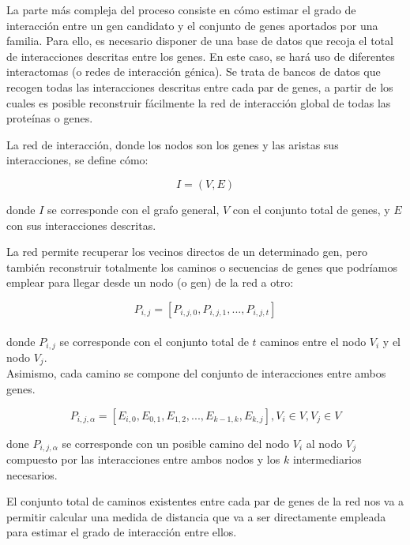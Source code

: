 La parte más compleja del proceso consiste en cómo estimar el grado de interacción entre un gen candidato y el conjunto de genes aportados por una familia. Para ello, es necesario disponer de una base de datos que recoja el total de interacciones descritas entre los genes. En este caso, se hará uso de diferentes interactomas (o redes de interacción génica). Se trata de bancos de datos que recogen todas las interacciones descritas entre cada par de genes, a partir de los cuales es posible reconstruir fácilmente la red de interacción global de todas las proteínas o genes. 

\medskip
La red de interacción, donde los nodos son los genes y las aristas sus interacciones, se define cómo:


\begin{equation}
I = (V,E)
\end{equation}

donde $I$ se corresponde con el grafo general, $V$ con el conjunto total de genes, y $E$ con sus interacciones descritas.

\medskip
La red permite recuperar los vecinos directos de un determinado gen, pero también reconstruir totalmente los caminos o secuencias de genes que podríamos emplear para llegar desde un nodo (o gen) de la red a otro:

\begin{equation}
 P_{i,j} = [P_{i,j,0},P_{i,j,1},...,P_{i,j,t}]
\end{equation}
\\

donde $P_{i,j}$ se corresponde con el conjunto total de $t$ caminos entre el nodo $V_i$ y el nodo $V_j$.
\\

Asimismo, cada camino se compone del conjunto de interacciones entre ambos genes.

\begin{equation}
P_{i,j,\alpha} = [E_{i,0},E_{0,1},E_{1,2},...,E_{k-1,k},E_{k,j}], V_i \in V, V_j \in V
\end{equation}

done $P_{i,j,\alpha}$ se corresponde con un posible camino del nodo $V_i$ al nodo $V_j$ compuesto por las interacciones entre ambos nodos y los $k$ intermediarios necesarios.

\medskip
El conjunto total de caminos existentes entre cada par de genes de la red nos va a permitir calcular una medida de distancia que va a ser directamente empleada para estimar el grado de interacción entre ellos. 

